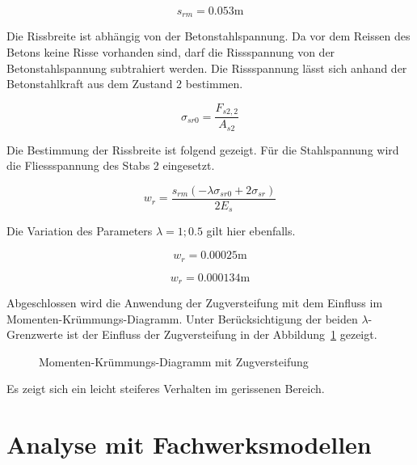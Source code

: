\documentclass[
  12pt,
  letterpaper,
  egregdoesnotlikesansseriftitles]{scrreprt}
\begin{document}
\begin{equation}s_{rm} = 0.053 \text{m}\end{equation}

Die Rissbreite ist abhängig von der Betonstahlspannung. Da vor dem
Reissen des Betons keine Risse vorhanden sind, darf die Rissspannung von
der Betonstahlspannung subtrahiert werden. Die Rissspannung lässt sich
anhand der Betonstahlkraft aus dem Zustand 2 bestimmen.

\begin{equation}\sigma_{sr0} = \frac{F_{s2,2}}{A_{s 2}}\end{equation}

Die Bestimmung der Rissbreite ist folgend gezeigt. Für die Stahlspannung
wird die Fliessspannung des Stabs 2 eingesetzt.

\begin{equation}w_{r} = \frac{s_{rm} \left(- \lambda \sigma_{sr0} + 2 \sigma_{sr}\right)}{2 E_{s}}\end{equation}

Die Variation des Parameters \(\lambda = 1 ; 0.5\) gilt hier ebenfalls.

\begin{equation}w_{r} = 0.00025 \text{m}\end{equation}

\begin{equation}w_{r} = 0.000134 \text{m}\end{equation}

Abgeschlossen wird die Anwendung der Zugversteifung mit dem Einfluss im
Momenten-Krümmungs-Diagramm. Unter Berücksichtigung der beiden
\(\lambda\)-Grenzwerte ist der Einfluss der Zugversteifung in der
Abbildung~\ref{fig-mchi_diagramm_zugversteifung_sv14} gezeigt.

\begin{figure}[H]


\caption{\label{fig-mchi_diagramm_zugversteifung_sv14}Momenten-Krümmungs-Diagramm
mit Zugversteifung}

\end{figure}%

Es zeigt sich ein leicht steiferes Verhalten im gerissenen Bereich.

\section{Analyse mit
Fachwerksmodellen}\label{analyse-mit-fachwerksmodellen-1}
\end{document}
